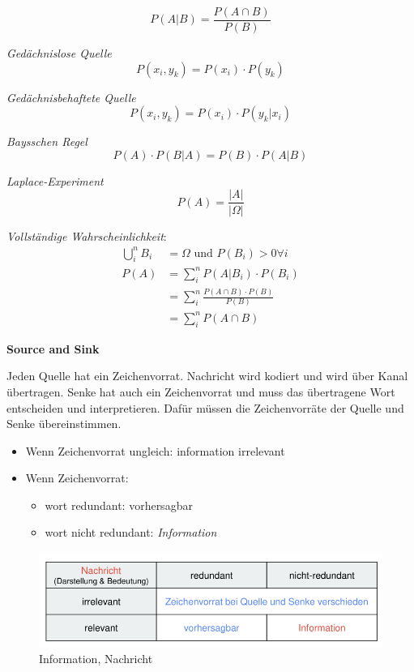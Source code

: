 \documentclass[11pt,twoside,twocolumn,landscape]{article}
\begin{document}
\begin{equation}
P(A|B) = \frac{P(A \cap B)}{P(B)}
\end{equation}

\emph{Gedächnislose Quelle}
\begin{equation}
P(x_i, y_k) = P(x_i) \cdot P(y_k)
\end{equation}

\emph{Gedächnisbehaftete Quelle}
\begin{equation}
P(x_i, y_k) = P(x_i) \cdot P(y_k | x_i)
\end{equation}

\emph{Baysschen Regel}
\begin{equation}
P(A) \cdot P(B|A) = P(B) \cdot P(A|B)
\end{equation}

\emph{Laplace-Experiment}
\begin{equation}
P(A) = \frac{|A|}{|\Omega|}
\end{equation}

\emph{Vollständige Wahrscheinlichkeit}:
\begin{align}
\bigcup_{i}^{n} B_i &= \Omega \text{ und } P(B_i) > 0 \forall i \\
P(A) &= \sum_{i}^{n} P(A|B_i) \cdot P(B_i) \\
&= \sum_{i}^{n} \frac{P(A \cap B) \cdot P(B)}{P(B)} \\
&= \sum_{i}^{n} P(A \cap B)
\end{align}

\textbf{Source and Sink}

Jeden Quelle hat ein Zeichenvorrat.
Nachricht wird kodiert und wird über Kanal übertragen.
Senke hat auch ein Zeichenvorrat und muss das übertragene Wort entscheiden und interpretieren.
Dafür müssen die Zeichenvorräte der Quelle und Senke übereinstimmen.

\begin{itemize}
\item Wenn Zeichenvorrat ungleich: information irrelevant
\item Wenn Zeichenvorrat:
\begin{itemize}
\item wort redundant: vorhersagbar
\item wort nicht redundant: \emph{Information}
\end{itemize}
\end{itemize}


\begin{figure}[htbp]
\centering
\includegraphics[width=.9\linewidth]{img/informations_uebertragung_information.png}
\caption{\label{fig:orga6a1ff4}Information, Nachricht}
\end{figure}
\end{document}
